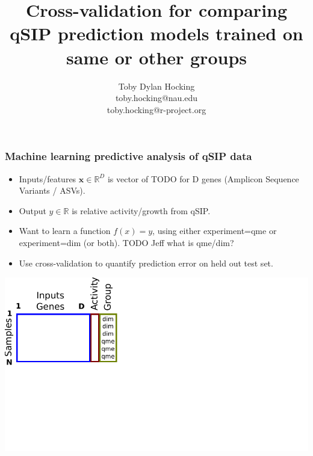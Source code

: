 \documentclass{beamer}
\begin{document}
\title{Cross-validation for comparing qSIP prediction models trained
  on same or other groups}

\author{
  Toby Dylan Hocking\\
  toby.hocking@nau.edu\\
  toby.hocking@r-project.org\\
}

\maketitle

\begin{frame}
  \frametitle{Machine learning predictive analysis of qSIP data}
  \begin{itemize}
  \item Inputs/features $\mathbf x\in\mathbb R^D$ is vector of TODO for D genes
    (Amplicon Sequence Variants / ASVs).
  \item Output $y\in\mathbb R$ is relative activity/growth from qSIP.
  \item Want to learn a function $f(x)=y$, using either experiment=qme
    or experiment=dim (or both). TODO Jeff what is qme/dim?
  \item Use cross-validation to quantify prediction error on held out
    test set.
  \end{itemize}
\end{frame}


\begin{frame}
  \includegraphics[width=\textwidth]{drawing-cv-same-other-1}
\end{frame}
\end{document}
